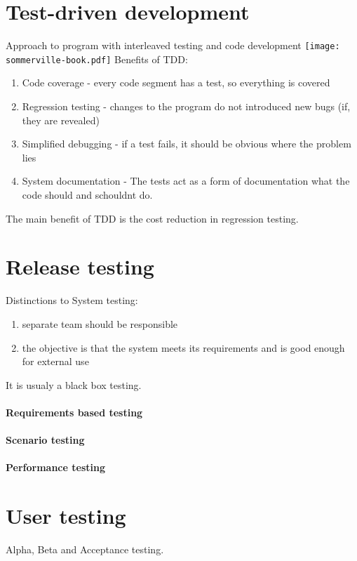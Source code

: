 \documentclass[a4paper,11pt,twocolumn]{report}
\begin{document}
    \section{Test-driven development}
    Approach to program with interleaved testing and code development
    \texttt{[image: sommerville-book.pdf]}
    Benefits of TDD:
    \begin{enumerate}
        \item Code coverage - every code segment has a test, so everything is
            covered
        \item Regression testing - changes to the program do not introduced
            new bugs (if, they are revealed)
        \item Simplified debugging - if a test fails, it should be obvious
            where the problem lies
        \item System documentation - The tests act as a form of documentation
            what the code should and schouldnt do.
    \end{enumerate}
    The main benefit of TDD is the cost reduction in regression testing.
    \section{Release testing}
    Distinctions to System testing:
    \begin{enumerate}
        \item separate team should be responsible
        \item the objective is that the system meets its requirements and is
            good enough for external use
    \end{enumerate}
    It is usualy a black box testing.
    \paragraph{Requirements based testing}
    \paragraph{Scenario testing}
    \paragraph{Performance testing}
    \section{User testing}
    Alpha, Beta and Acceptance testing.
\end{document}
